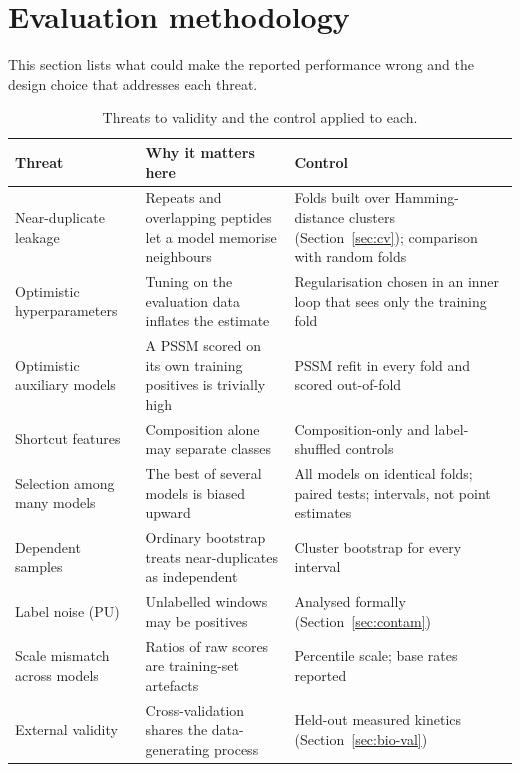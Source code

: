 \section{Evaluation methodology}
\label{sec:eval}

This section lists what could make the reported performance wrong and the design choice that addresses each threat.

\begin{table}[!htbp]
\centering\small
\begin{tabular}{@{}p{4.1cm}p{5.2cm}p{5.6cm}@{}}\toprule
Threat & Why it matters here & Control \\\midrule
Near-duplicate leakage & Repeats and overlapping peptides let a model memorise neighbours & Folds built over Hamming-distance clusters (Section~\ref{sec:cv}); comparison with random folds \\
Optimistic hyperparameters & Tuning on the evaluation data inflates the estimate & Regularisation chosen in an inner loop that sees only the training fold \\
Optimistic auxiliary models & A PSSM scored on its own training positives is trivially high & PSSM refit in every fold and scored out-of-fold \\
Shortcut features & Composition alone may separate classes & Composition-only and label-shuffled controls \\
Selection among many models & The best of several models is biased upward & All models on identical folds; paired tests; intervals, not point estimates \\
Dependent samples & Ordinary bootstrap treats near-duplicates as independent & Cluster bootstrap for every interval \\
Label noise (PU) & Unlabelled windows may be positives & Analysed formally (Section~\ref{sec:contam}) \\
Scale mismatch across models & Ratios of raw scores are training-set artefacts & Percentile scale; base rates reported \\
External validity & Cross-validation shares the data-generating process & Held-out measured kinetics (Section~\ref{sec:bio-val}) \\\bottomrule
\end{tabular}
\caption{Threats to validity and the control applied to each.}
\end{table}

